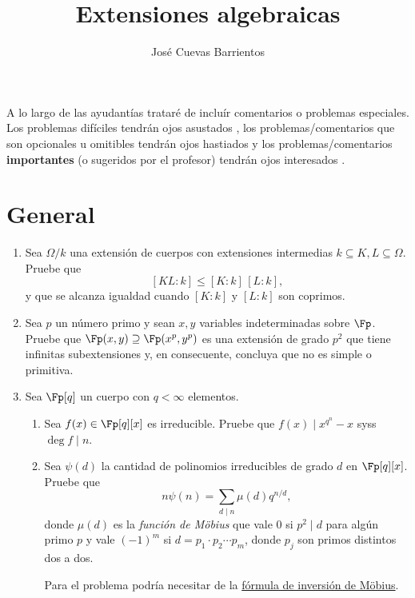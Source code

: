 \documentclass[11pt, reqno]{amsart}
\title{Extensiones algebraicas}
\date{\DTMdate{2025-08-13}}
\author{José Cuevas Barrientos}
\begin{document}
\maketitle

A lo largo de las ayudantías trataré de incluír comentarios o problemas especiales.
Los problemas difíciles tendrán ojos asustados {\straighteyes},
los problemas/comentarios que son opcionales u omitibles tendrán ojos hastiados {\upeyes}
y los problemas/comentarios \textbf{importantes} (o sugeridos por el profesor) tendrán ojos interesados {\righteyes}.

\section{General}
\begin{enumerate}

	\item Sea $\Omega/k$ una extensión de cuerpos con extensiones intermedias $k \subseteq K, L \subseteq \Omega$.
		Pruebe que
		\[
			[KL : k] \le [K : k] \, [L : k],
		\]
		y que se alcanza igualdad cuando $[K : k]$ y $[L : k]$ son coprimos.


	\item\lookright
		Sea $p$ un número primo y sean $x,y$ variables indeterminadas sobre $\Fp$.
		Pruebe que $\Fp(x, y) \supseteq \Fp(x^p, y^p)$ es una extensión de grado $p^2$ que tiene infinitas subextensiones y,
		en consecuente, concluya que no es simple o primitiva. 

	\item\lookright
		Sea $\Fp[q]$ un cuerpo con $q < \infty$ elementos.
		\begin{enumerate}
			\item Sea $f(x) \in \Fp[q][x]$ es irreducible.
				Pruebe que $f(x) \mid x^{q^n} - x$ syss $\deg f \mid n$.

			\item Sea $\psi(d)$ la cantidad de polinomios irreducibles de grado $d$ en $\Fp[q][x]$.
				Pruebe que
				\[
					n \psi(n) = \sum_{d \mid n} \mu(d) q^{n/d},
				\]
				donde $\mu(d)$ es la \emph{función de Möbius} que vale 0 si $p^2 \mid d$ para algún primo $p$ y vale
				$(-1)^m$ si $d = p_1 \cdot p_2 \cdots p_m$, donde $p_j$ son primos distintos dos a dos.

				\begin{hint}
					Para el problema podría necesitar de la \href{https://es.wikipedia.org/wiki/Fórmula_de_inversión_de_Möbius}{fórmula de inversión de Möbius}.
				\end{hint}
		\end{enumerate}
\end{enumerate}
\end{document}
